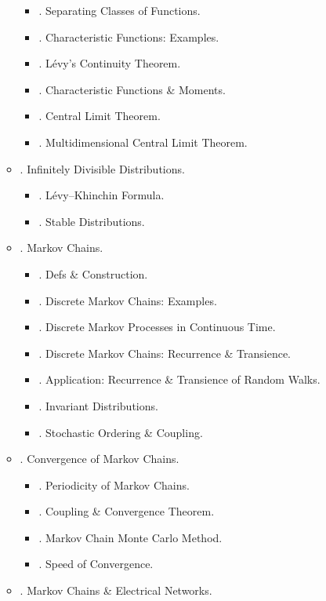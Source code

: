 \documentclass{article}
\begin{document}
\begin{enumerate}
\begin{itemize}
		\begin{itemize}
			\item {. Separating Classes of Functions.}
			\item {. Characteristic Functions: Examples.}
			\item {. L\'evy's Continuity Theorem.}
			\item {. Characteristic Functions \& Moments.}
			\item {. Central Limit Theorem.}
			\item {. Multidimensional Central Limit Theorem.}
		\end{itemize}
		\item {. Infinitely Divisible Distributions.}
		\begin{itemize}
			\item {. L\'evy--Khinchin Formula.}
			\item {. Stable Distributions.}
		\end{itemize}
		\item {. Markov Chains.}
		\begin{itemize}
			\item {. Defs \& Construction.}
			\item {. Discrete Markov Chains: Examples.}
			\item {. Discrete Markov Processes in Continuous Time.}
			\item {. Discrete Markov Chains: Recurrence \& Transience.}
			\item {. Application: Recurrence \& Transience of Random Walks.}
			\item {. Invariant Distributions.}
			\item {. Stochastic Ordering \& Coupling.}
		\end{itemize}
		\item {. Convergence of Markov Chains.}
		\begin{itemize}
			\item {. Periodicity of Markov Chains.}
			\item {. Coupling \& Convergence Theorem.}
			\item {. Markov Chain Monte Carlo Method.}
			\item {. Speed of Convergence.}
		\end{itemize}
		\item {. Markov Chains \& Electrical Networks.}
		\begin{itemize}

\end{itemize}
\end{itemize}
\end{enumerate}
\end{document}
